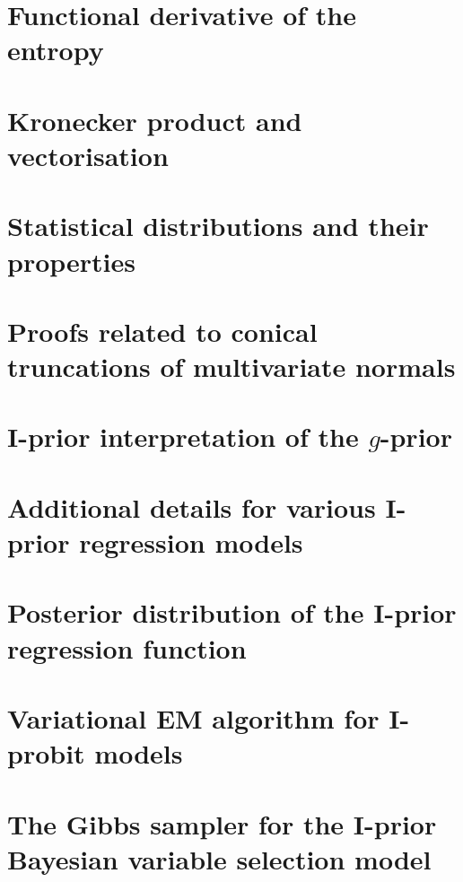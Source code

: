 \documentclass[showframe,11pt,twoside,openright]{report}
\begin{document}

\appendix

\chapter{Functional derivative of the entropy}\label{apx:funcder}
\thispagestyle{chapterapx}


\chapter{Kronecker product and vectorisation}
\thispagestyle{chapterapx}


\chapter{Statistical distributions and their properties}
\thispagestyle{chapterapx}


\chapter{Proofs related to conical truncations of multivariate normals}\label{apx:contrunproof}
\thispagestyle{chapterapx}


\chapter{I-prior interpretation of the $g$-prior}\label{misc:gprior}
\thispagestyle{chapterapx}


\chapter{Additional details for various I-prior regression models}
\thispagestyle{chapterapx}


\chapter{Posterior distribution of the I-prior regression function}
\thispagestyle{chapterapx}


\chapter{Variational EM algorithm for I-probit models}\label{apx:varemiprobit}
\thispagestyle{chapterapx}


\chapter{The Gibbs sampler for the I-prior Bayesian variable selection model}\label{apx:gibbsbvs}
\thispagestyle{chapterapx}

 
\hClosingStuffStandalone
\end{document}
